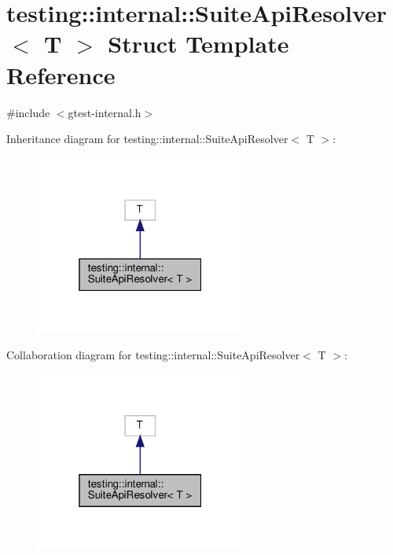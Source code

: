\hypertarget{structtesting_1_1internal_1_1SuiteApiResolver}{}\section{testing\+:\+:internal\+:\+:Suite\+Api\+Resolver$<$ T $>$ Struct Template Reference}
\label{structtesting_1_1internal_1_1SuiteApiResolver}


{\ttfamily \#include $<$gtest-\/internal.\+h$>$}



Inheritance diagram for testing\+:\+:internal\+:\+:Suite\+Api\+Resolver$<$ T $>$\+:\nopagebreak
\begin{figure}[H]
\begin{center}
\leavevmode
\includegraphics[width=196pt]{structtesting_1_1internal_1_1SuiteApiResolver__inherit__graph}
\end{center}
\end{figure}


Collaboration diagram for testing\+:\+:internal\+:\+:Suite\+Api\+Resolver$<$ T $>$\+:\nopagebreak
\begin{figure}[H]
\begin{center}
\leavevmode
\includegraphics[width=196pt]{structtesting_1_1internal_1_1SuiteApiResolver__coll__graph}
\end{center}
\end{figure}
